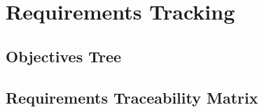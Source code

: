 \section{Requirements Tracking}
\label{sec:requirements_tracking}

\subsection{Objectives Tree}
\label{sec:objectives_tree}


\subsection{Requirements Traceability Matrix}
\label{sec:requirements_matrix}


